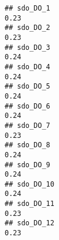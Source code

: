 \documentclass[
]{article}
\begin{document}
\begin{verbatim}
## sdo_DO_1                                                                                                                                                                                                                     0.23
## sdo_DO_2                                                                                                                                                                                                                     0.23
## sdo_DO_3                                                                                                                                                                                                                     0.24
## sdo_DO_4                                                                                                                                                                                                                     0.24
## sdo_DO_5                                                                                                                                                                                                                     0.24
## sdo_DO_6                                                                                                                                                                                                                     0.24
## sdo_DO_7                                                                                                                                                                                                                     0.23
## sdo_DO_8                                                                                                                                                                                                                     0.24
## sdo_DO_9                                                                                                                                                                                                                     0.24
## sdo_DO_10                                                                                                                                                                                                                    0.24
## sdo_DO_11                                                                                                                                                                                                                    0.23
## sdo_DO_12                                                                                                                                                                                                                    0.23

\end{verbatim}
\end{document}
